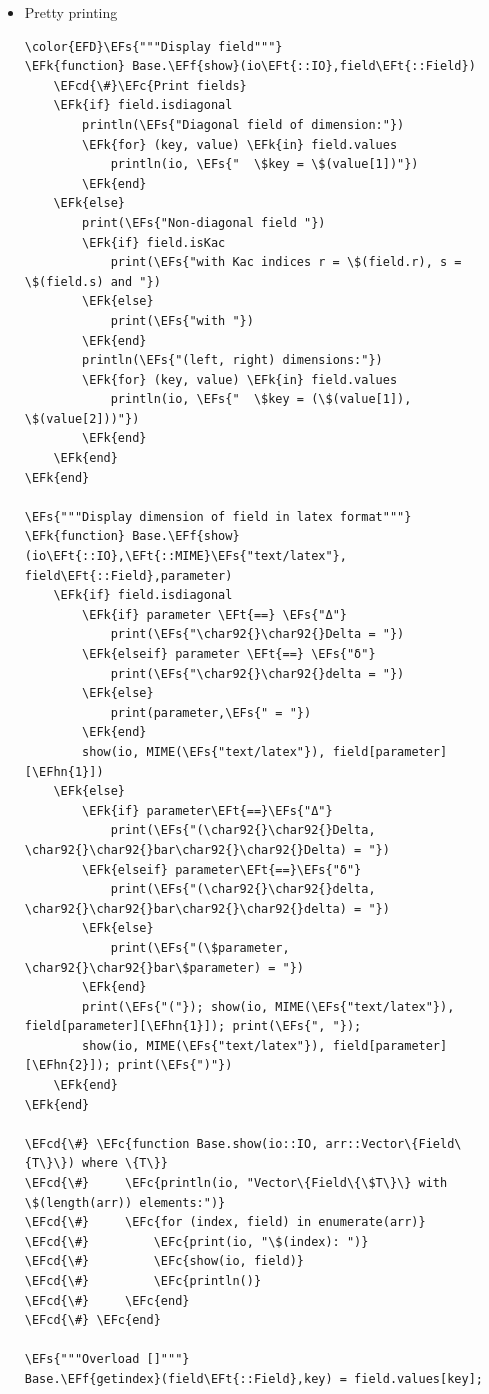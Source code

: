 \documentclass[a4paper]{article}
\numberwithin{equation}{section}
\newcommand{\EFc}[1]{\textcolor{EFc}{#1}} %
\newcommand{\EFcd}[1]{\textcolor{EFcd}{#1}} %
\newcommand{\EFs}[1]{\textcolor{EFs}{#1}} %
\newcommand{\EFk}[1]{\textcolor{EFk}{#1}} %
\newcommand{\EFf}[1]{\textcolor{EFf}{#1}} %
\newcommand{\EFt}[1]{\textcolor{EFt}{#1}} %
\newcommand{\EFhn}[1]{\textcolor{EFhn}{#1}} %
\begin{document}
\begin{itemize}
\item Pretty printing
\label{sec:org96d2cbb}

\begin{Code}
\begin{Verbatim}
\color{EFD}\EFs{"""Display field"""}
\EFk{function} Base.\EFf{show}(io\EFt{::IO},field\EFt{::Field})
    \EFcd{\#}\EFc{Print fields}
    \EFk{if} field.isdiagonal
        println(\EFs{"Diagonal field of dimension:"})
        \EFk{for} (key, value) \EFk{in} field.values
            println(io, \EFs{"  \$key = \$(value[1])"})
        \EFk{end}
    \EFk{else}
        print(\EFs{"Non-diagonal field "})
        \EFk{if} field.isKac
            print(\EFs{"with Kac indices r = \$(field.r), s = \$(field.s) and "})
        \EFk{else}
            print(\EFs{"with "})
        \EFk{end}
        println(\EFs{"(left, right) dimensions:"})
        \EFk{for} (key, value) \EFk{in} field.values
            println(io, \EFs{"  \$key = (\$(value[1]), \$(value[2]))"})
        \EFk{end}
    \EFk{end}
\EFk{end}

\EFs{"""Display dimension of field in latex format"""}
\EFk{function} Base.\EFf{show}(io\EFt{::IO},\EFt{::MIME}\EFs{"text/latex"}, field\EFt{::Field},parameter)
    \EFk{if} field.isdiagonal
        \EFk{if} parameter \EFt{==} \EFs{"Δ"}
            print(\EFs{"\char92{}\char92{}Delta = "})
        \EFk{elseif} parameter \EFt{==} \EFs{"δ"}
            print(\EFs{"\char92{}\char92{}delta = "})
        \EFk{else}
            print(parameter,\EFs{" = "})
        \EFk{end}
        show(io, MIME(\EFs{"text/latex"}), field[parameter][\EFhn{1}])
    \EFk{else}
        \EFk{if} parameter\EFt{==}\EFs{"Δ"}
            print(\EFs{"(\char92{}\char92{}Delta, \char92{}\char92{}bar\char92{}\char92{}Delta) = "})
        \EFk{elseif} parameter\EFt{==}\EFs{"δ"}
            print(\EFs{"(\char92{}\char92{}delta, \char92{}\char92{}bar\char92{}\char92{}delta) = "})
        \EFk{else}
            print(\EFs{"(\$parameter, \char92{}\char92{}bar\$parameter) = "})
        \EFk{end}
        print(\EFs{"("}); show(io, MIME(\EFs{"text/latex"}), field[parameter][\EFhn{1}]); print(\EFs{", "});
        show(io, MIME(\EFs{"text/latex"}), field[parameter][\EFhn{2}]); print(\EFs{")"})
    \EFk{end}
\EFk{end}

\EFcd{\#} \EFc{function Base.show(io::IO, arr::Vector\{Field\{T\}\}) where \{T\}}
\EFcd{\#}     \EFc{println(io, "Vector\{Field\{\$T\}\} with \$(length(arr)) elements:")}
\EFcd{\#}     \EFc{for (index, field) in enumerate(arr)}
\EFcd{\#}         \EFc{print(io, "\$(index): ")}
\EFcd{\#}         \EFc{show(io, field)}
\EFcd{\#}         \EFc{println()}
\EFcd{\#}     \EFc{end}
\EFcd{\#} \EFc{end}

\EFs{"""Overload []"""}
Base.\EFf{getindex}(field\EFt{::Field},key) = field.values[key];
\end{Verbatim}
\end{Code}
\end{itemize}
\end{document}
